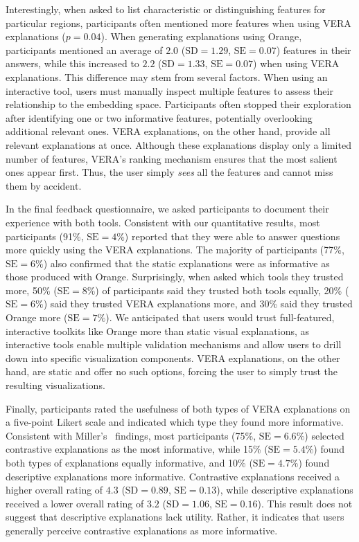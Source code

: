 \documentclass[lettersize,journal]{IEEEtran}
\begin{document}
Interestingly, when asked to list characteristic or distinguishing features for particular regions, participants often mentioned more features when using VERA explanations ($p=0.04$). When generating explanations using Orange, participants mentioned an average of $2.0$ ($\text{SD}= 1.29$, $\text{SE}=0.07$) features in their answers, while this increased to $2.2$ ($\text{SD}= 1.33$, $\text{SE}=0.07$) when using VERA explanations. This difference may stem from several factors. When using an interactive tool, users must manually inspect multiple features to assess their relationship to the embedding space. Participants often stopped their exploration after identifying one or two informative features, potentially overlooking additional relevant ones. VERA explanations, on the other hand, provide all relevant explanations at once. Although these explanations display only a limited number of features, VERA’s ranking mechanism ensures that the most salient ones appear first. Thus, the user simply \textit{sees} all the features and cannot miss them by accident.

In the final feedback questionnaire, we asked participants to document their experience with both tools. Consistent with our quantitative results, most participants (91\%, $\text{SE}=4\%$) reported that they were able to answer questions more quickly using the VERA explanations. The majority of participants (77\%, $\text{SE}=6\%$) also confirmed that the static explanations were as informative as those produced with Orange.
Surprisingly, when asked which tools they trusted more, 50\% ($\text{SE}=8\%$) of participants said they trusted both tools equally, 20\% ($\text{SE}=6\%$) said they trusted VERA explanations more, and 30\% said they trusted Orange more ($\text{SE}=7\%$). 
We anticipated that users would trust full-featured, interactive toolkits like Orange more than static visual explanations, as interactive tools enable multiple validation mechanisms and allow users to drill down into specific visualization components. VERA explanations, on the other hand, are static and offer no such options, forcing the user to simply trust the resulting visualizations.

Finally, participants rated the usefulness of both types of VERA explanations on a five-point Likert scale and indicated which type they found more informative. Consistent with Miller's~\cite{Miller2019} findings, most participants (75\%, $\text{SE}=6.6\%$) selected contrastive explanations as the most informative, while 15\% ($\text{SE}=5.4\%$) found both types of explanations equally informative, and 10\% ($\text{SE}=4.7\%$) found descriptive explanations more informative.
Contrastive explanations received a higher overall rating of $4.3$ ($\text{SD}= 0.89$, $\text{SE}=0.13$), while descriptive explanations received a lower overall rating of $3.2$ ($\text{SD}= 1.06$, $\text{SE}=0.16$).
This result does not suggest that descriptive explanations lack utility. Rather, it indicates that users generally perceive contrastive explanations as more informative.
\end{document}
